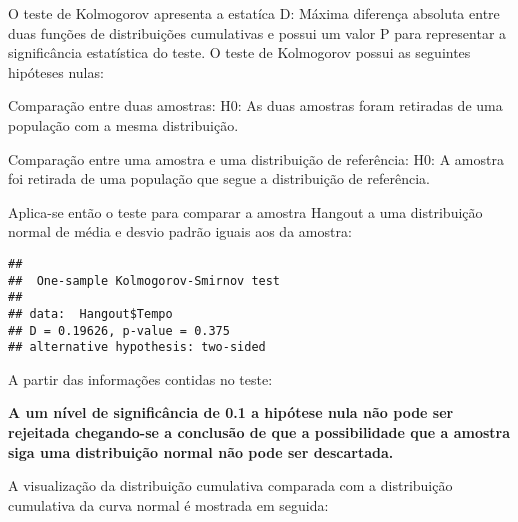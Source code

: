 \documentclass[
]{article}
\newenvironment{Shaded}{\begin{snugshade}}{\end{snugshade}}
\newcommand{\DataTypeTok}[1]{\textcolor[rgb]{0.13,0.29,0.53}{#1}}
\newcommand{\DecValTok}[1]{\textcolor[rgb]{0.00,0.00,0.81}{#1}}
\newcommand{\KeywordTok}[1]{\textcolor[rgb]{0.13,0.29,0.53}{\textbf{#1}}}
\newcommand{\NormalTok}[1]{#1}
\newcommand{\OperatorTok}[1]{\textcolor[rgb]{0.81,0.36,0.00}{\textbf{#1}}}
\newcommand{\StringTok}[1]{\textcolor[rgb]{0.31,0.60,0.02}{#1}}
\begin{document}
O teste de Kolmogorov apresenta a estatíca D: Máxima diferença absoluta
entre duas funções de distribuições cumulativas e possui um valor P para
representar a significância estatística do teste. O teste de Kolmogorov
possui as seguintes hipóteses nulas:

Comparação entre duas amostras: H0: As duas amostras foram retiradas de
uma população com a mesma distribuição.

Comparação entre uma amostra e uma distribuição de referência: H0: A
amostra foi retirada de uma população que segue a distribuição de
referência.

Aplica-se então o teste para comparar a amostra Hangout a uma
distribuição normal de média e desvio padrão iguais aos da amostra:

\begin{Shaded}
\end{Shaded}

\begin{verbatim}
## 
##  One-sample Kolmogorov-Smirnov test
## 
## data:  Hangout$Tempo
## D = 0.19626, p-value = 0.375
## alternative hypothesis: two-sided
\end{verbatim}

A partir das informações contidas no teste:

\textbf{A um nível de significância de 0.1 a hipótese nula não pode ser
rejeitada chegando-se a conclusão de que a possibilidade que a amostra
siga uma distribuição normal não pode ser descartada.}

A visualização da distribuição cumulativa comparada com a distribuição
cumulativa da curva normal é mostrada em seguida:

\begin{Shaded}
\end{Shaded}
\end{document}
